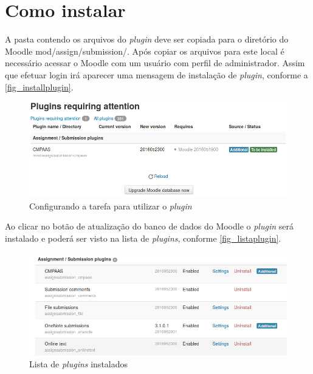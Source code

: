 \documentclass[
	12pt,				%
	openright,			%
	oneside,			%
	a4paper,			%
	english,			%
	french,				%
	spanish,			%
	brazil				%
	]{abntex2}
\begin{document}
\section{Como instalar}
A pasta contendo os arquivos do \textit{plugin} deve ser copiada para o diretório do Moodle mod/assign/submission/. Após copiar os arquivos para este local é necessário acessar o Moodle com um usuário com perfil de administrador. Assim que efetuar login irá aparecer uma mensagem de instalação de \textit{plugin}, conforme a \autoref{fig_installplugin}.
\begin{figure}[htb]
	\caption{\label{fig_installplugin} Configurando a tarefa para utilizar o \textit{plugin}}
	\begin{center}
		\includegraphics[scale=0.4]{installplugin.png}
	\end{center}
\end{figure}

Ao clicar no botão de atualização do banco de dados do Moodle o \textit{plugin} será instalado e poderá ser visto na lista de \textit{plugins}, conforme \autoref{fig_listaplugin}.

\begin{figure}[htb]
	\caption{\label{fig_listaplugin} Lista de \textit{plugins} instalados}
	\begin{center}
		\includegraphics[scale=0.4]{listaplugin.png}
	\end{center}
\end{figure}
\end{document}
